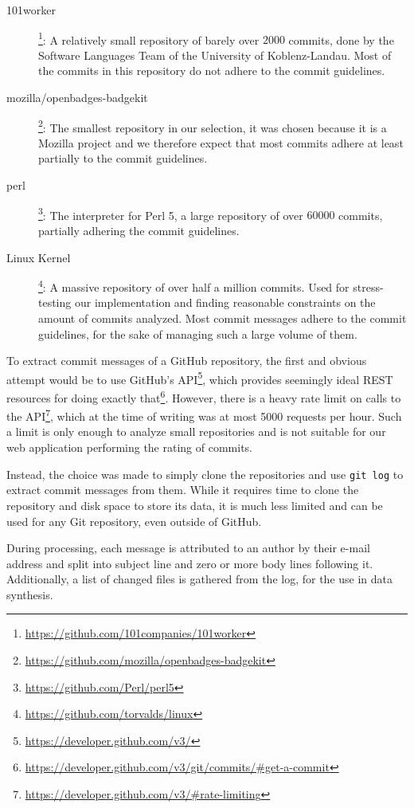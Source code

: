 \begin{description}
    \item[101worker]\footnote{\url{https://github.com/101companies/101worker}}: A relatively small repository of barely over $2000$ commits, done by the Software Languages Team of the University of Koblenz-Landau. Most of the commits in this repository do not adhere to the commit guidelines.
    \item[mozilla/openbadges-badgekit]\footnote{\url{https://github.com/mozilla/openbadges-badgekit}}: The smallest repository in our selection, it was chosen because it is a Mozilla project and we therefore expect that most commits adhere at least partially to the commit guidelines.
    \item[perl]\footnote{\url{https://github.com/Perl/perl5}}: The interpreter for Perl 5, a large repository of over $60000$ commits, partially adhering the commit guidelines.
    \item[Linux Kernel]\footnote{\url{https://github.com/torvalds/linux}}: A massive repository of over half a million commits. Used for stress-testing our implementation and finding reasonable constraints on the amount of commits analyzed. Most commit messages adhere to the commit guidelines, for the sake of managing such a large volume of them.
\end{description}

To extract commit messages of a GitHub repository, the first and obvious attempt would be to use GitHub's API\footnote{\url{https://developer.github.com/v3/}}, which provides seemingly ideal REST resources for doing exactly that\footnote{\url{https://developer.github.com/v3/git/commits/\#get-a-commit}}. However, there is a heavy rate limit on calls to the API\footnote{\url{https://developer.github.com/v3/\#rate-limiting}}, which at the time of writing was at most 5000 requests per hour. Such a limit is only enough to analyze small repositories and is not suitable for our web application performing the rating of commits.

Instead, the choice was made to simply clone the repositories and use \texttt{git log} to extract commit messages from them. While it requires time to clone the repository and disk space to store its data, it is much less limited and can be used for any Git repository, even outside of GitHub.

During processing, each message is attributed to an author by their e-mail address and split into subject line and zero or more body lines following it. Additionally, a list of changed files is gathered from the log, for the use in data synthesis.

